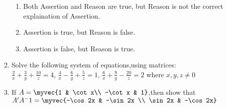 \documentclass{article}
\begin{document}
\begin{enumerate}
\begin{enumerate}
			\item Both Assertion and Reason are true, but Reason is not the correct explaination of Assertion.
			\item Assertion is true, but Reason is false.
			\item Assertion is false, but Reason is true.
		\end{enumerate}
	\item Solve the following system of equations,using matrices:\\
		$\frac{2}{x} + \frac{3}{y} + \frac{10}{z}  = 4$, $\frac{4}{x} - \frac{6}{y}  + \frac{5}{z} =1$, $\frac{6}{x} + \frac{9}{y} - \frac{20}{z} = 2$ where $x,y,z \neq 0$\\
	\item If $A= \myvec{1 & \cot x\\ -\cot x & 1}$,then show that $A'A^-1= \myvec{-\cos 2x & -\sin 2x \\ \sin 2x & -\cos 2x}$
\end{enumerate}
\end{document}
